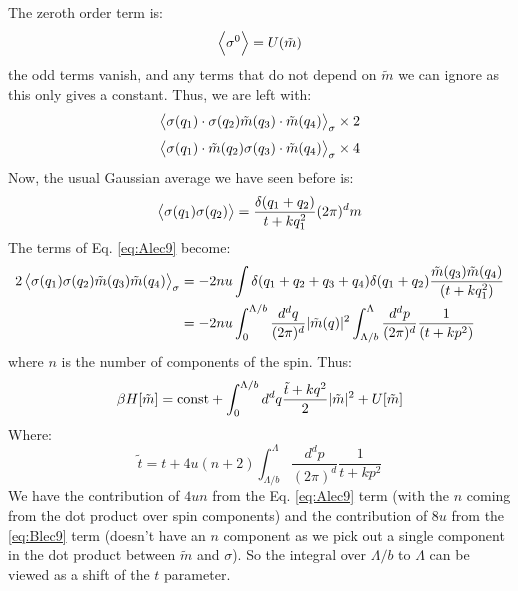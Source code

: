 The zeroth order term is:
\begin{equation}
    \left< \sigma^0 \right> = U(\tilde{m})
\end{equation}
the odd terms vanish, and any terms that do not depend on $\tilde{m}$ we can ignore as this only gives a constant. Thus, we are left with:
\begin{equation}\label{eq:Alec9}
    \left< \sigma(q_1)\cdot \sigma(q_2)\tilde{m}(q_3) \cdot \tilde{m}(q_4) \right>_\sigma \times 2
\end{equation}
\begin{equation}\label{eq:Blec9}
    \left< \sigma(q_1)\cdot \tilde{m}(q_2)\sigma(q_3)\cdot \tilde{m}(q_4) \right>_\sigma \times 4
\end{equation}
Now, the usual Gaussian average we have seen before is:
\begin{equation}
    \left< \sigma(q_1)\sigma(q_2) \right> = \frac{\delta(q_1 + q_2)}{t + kq_1^2}(2\pi)^d m
\end{equation}
The terms of Eq. \eqref{eq:Alec9} become:
\begin{equation}
    \begin{split}
        2\left< \sigma(q_1)\sigma(q_2)\tilde{m}(q_3)\tilde{m}(q_4) \right>_\sigma &= -2nu\int \delta(q_1 + q_2 + q_3 + q_4)\delta(q_1 + q_2)\frac{\tilde{m}(q_3)\tilde{m}(q_4)}{(t + kq_1^2)} 
        \\ &= -2nu\int_0^{\Lambda/b}\frac{d^dq}{(2\pi)^d}\lvert \tilde{m}(q) \rvert^2\int_{\Lambda/b}^{\Lambda}\frac{d^dp}{(2\pi)^d}\frac{1}{(t + kp^2)}
    \end{split}
\end{equation}
where $n$ is the number of components of the spin. Thus:
\begin{equation}
    \beta H[\tilde{m}] = \text{const} + \int_0^{\Lambda/b}d^dq \frac{\tilde{t} + kq^2}{2}\lvert \tilde{m} \rvert^2 + U[\tilde{m}]
\end{equation}
Where:
\begin{equation}
    \tilde{t} = t + 4u(n+2)\int_{\Lambda/b}^\Lambda \frac{d^dp}{(2\pi)^d}\frac{1}{t+kp^2}
\end{equation}
We have the contribution of $4un$ from the Eq. \eqref{eq:Alec9} term (with the $n$ coming from the dot product over spin components) and the contribution of $8u$ from the \eqref{eq:Blec9} term (doesn't have an $n$ component as we pick out a single component in the dot product between $\tilde{m}$ and $\sigma$). So the integral over $\Lambda/b$ to $\Lambda$ can be viewed as a shift of the $t$ parameter.

